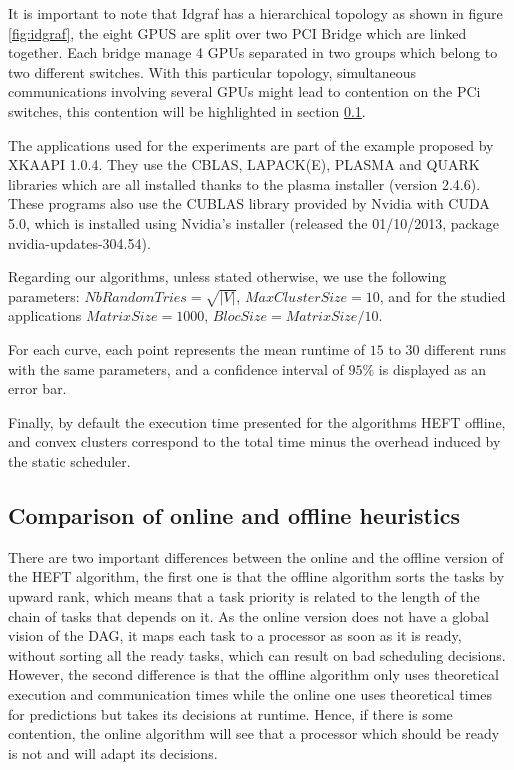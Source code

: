 \documentclass[10pt, conference, compsocconf,pdftex,dvipsnames]{IEEEtran}
\begin{document}
It is important to note that Idgraf has a hierarchical topology as shown in
figure \ref{fig:idgraf}, the eight GPUS are split over two PCI Bridge which
are linked together. Each bridge manage 4 GPUs separated in two groups which
belong to two different switches. With this particular topology, simultaneous
communications involving several GPUs might lead to contention on the PCi
switches, this contention will be highlighted in section
\ref{sec:exp-exp-perf}.

The applications used for the experiments are part of the example proposed by
XKAAPI 1.0.4. They use the CBLAS, LAPACK(E), PLASMA and QUARK libraries which
are all installed thanks to the plasma installer (version 2.4.6)\cite{PLASMA}.
These programs also use the CUBLAS library provided by Nvidia with CUDA 5.0,
which is installed using Nvidia's installer (released the 01/10/2013, 
package nvidia-updates-304.54).


Regarding our algorithms, unless stated otherwise, we use the following
parameters: $NbRandomTries=\sqrt{|V|}$, $MaxClusterSize=10$, and for the
studied applications $MatrixSize=1000$, $BlocSize=MatrixSize/10$. 

For each curve, each point represents the
mean runtime of $15$ to $30$ different runs with the same parameters, and a
confidence interval of $95\%$ is displayed as an error bar.

Finally, by default the execution time presented for the algorithms HEFT
offline, and convex clusters correspond to the total time minus the overhead
induced by the static scheduler.

\subsection{Comparison of online and offline heuristics}
\label{sec:exp-exp-perf}

There are two important differences between the online and the offline version
of the HEFT algorithm, the first one is that the offline algorithm sorts the
tasks by upward rank, which means that a task priority is related to the
length of the chain of tasks that depends on it. As the online version does
not have a global vision of the DAG, it maps each task to a processor as soon
as it is ready, without sorting all the ready tasks, which can result on bad
scheduling decisions.  However, the second difference is that the offline
algorithm only uses theoretical execution and communication times while the
online one uses theoretical times for predictions but takes its decisions at
runtime. Hence, if there is some contention, the online algorithm will see
that a processor which should be ready is not and will adapt its decisions.
\end{document}
